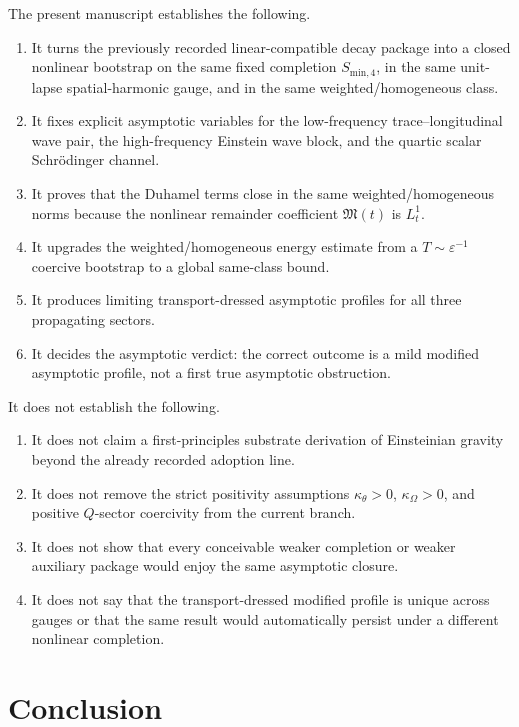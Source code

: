 \documentclass[11pt]{article}
\begin{document}
The present manuscript establishes the following.
\begin{enumerate}
    \item It turns the previously recorded linear-compatible decay package into a closed nonlinear bootstrap on the same fixed completion \(S_{\mathrm{min},4}\), in the same unit-lapse spatial-harmonic gauge, and in the same weighted/homogeneous class.
    \item It fixes explicit asymptotic variables for the low-frequency trace--longitudinal wave pair, the high-frequency Einstein wave block, and the quartic scalar Schr\"odinger channel.
    \item It proves that the Duhamel terms close in the same weighted/homogeneous norms because the nonlinear remainder coefficient \(\mathfrak M(t)\) is \(L_t^1\).
    \item It upgrades the weighted/homogeneous energy estimate from a \(T\sim \varepsilon^{-1}\) coercive bootstrap to a global same-class bound.
    \item It produces limiting transport-dressed asymptotic profiles for all three propagating sectors.
    \item It decides the asymptotic verdict: the correct outcome is a mild modified asymptotic profile, not a first true asymptotic obstruction.
\end{enumerate}

It does not establish the following.
\begin{enumerate}
    \item It does not claim a first-principles substrate derivation of Einsteinian gravity beyond the already recorded adoption line.
    \item It does not remove the strict positivity assumptions \(\kappa_\theta>0\), \(\kappa_\Omega>0\), and positive \(Q\)-sector coercivity from the current branch.
    \item It does not show that every conceivable weaker completion or weaker auxiliary package would enjoy the same asymptotic closure.
    \item It does not say that the transport-dressed modified profile is unique across gauges or that the same result would automatically persist under a different nonlinear completion.
\end{enumerate}

\section{Conclusion}
\end{document}
